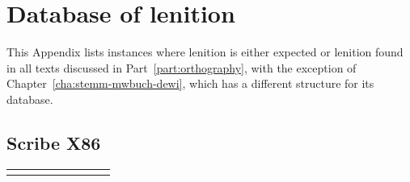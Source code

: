 \chapter{Database of lenition}
\label{cha:database-lenition}
This Appendix lists instances where lenition is either expected or lenition found in all texts discussed in Part~\ref{part:orthography}, with the exception of Chapter~\ref{cha:stemm-mwbuch-dewi}, which has a different structure for its database.


\begin{center}
\section{Scribe X86}
\label{sec:x86}
\begingroup
\small
\begin{longtable}{addwllwl}
  \toprule
   &  &  &  &  &  &  &  \\
  \midrule
  \endhead
  \bottomrule
  \endfoot

\end{longtable}
\end{center}

